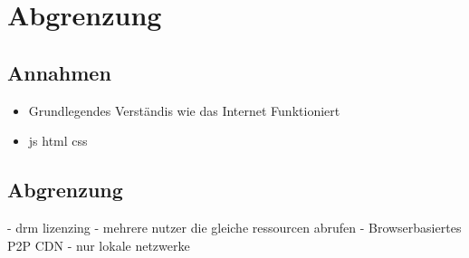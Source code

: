 \chapter{Abgrenzung}\label{ch:demarcation}

\section{Annahmen}
\begin{itemize}
	\item Grundlegendes Verständis wie das Internet Funktioniert
	\item js html css
\end{itemize}
\section{Abgrenzung}
- drm lizenzing
- mehrere nutzer die gleiche ressourcen abrufen
- Browserbasiertes P2P CDN
- nur lokale netzwerke
